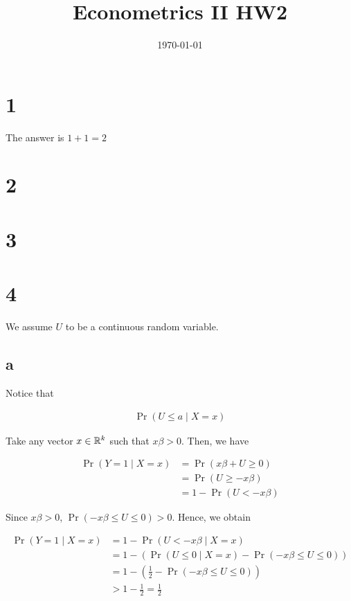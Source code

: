 \documentclass[11pt]{article}
\begin{document}
\title{Econometrics II HW2} %
\author{}  %
\date{\today}

\maketitle

\pagebreak

\section*{1}

The answer is $1 + 1 = 2$

\section*{2}
\section*{3}



\section*{4}

We assume $U$ to be a continuous random variable.

\subsection{a}\label{q:4_a}

Notice that

\begin{align*}
    \Pr(U \leq a \mid X = x)
\end{align*}

Take any vector $x\in \mathbb{R}^k$ such that $x\beta > 0$. Then, we have

\begin{align*}
    \Pr(Y = 1 \mid X = x)
    &= \Pr(x\beta + U \geq 0) \\
    &= \Pr(U \geq - x\beta) \\
    &= 1 - \Pr(U < - x\beta)
\end{align*}

Since $x\beta > 0$, $\Pr(- x\beta \leq U \leq 0) > 0$. Hence, we obtain

\begin{align*}
    \Pr(Y = 1 \mid X = x)
    &= 1 - \Pr(U < - x\beta \mid X = x) \\
    &= 1 - \left( \Pr(U \leq 0 \mid X = x) - \Pr(- x\beta \leq U \leq 0) \right) \\
    &= 1 - \left( \frac{1}{2} - \Pr(- x\beta \leq U \leq 0) \right) \\
    &> 1 - \frac{1}{2} = \frac{1}{2}
\end{align*}
\end{document}
